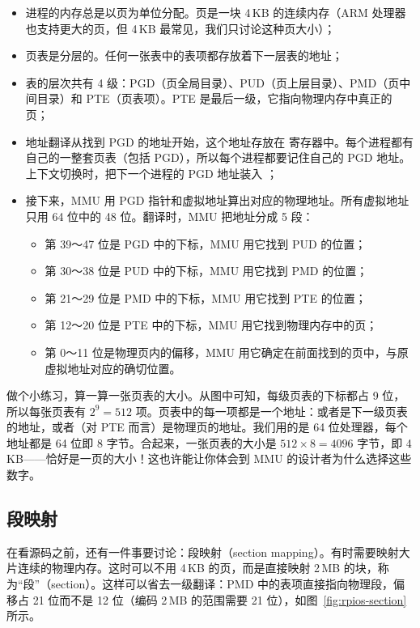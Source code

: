 \begin{itemize}
  \item 进程的内存总是以页为单位分配。页是一块 4\,KB 的连续内存（ARM 处理器也支持更大的页，但 4\,KB 最常见，我们只讨论这种页大小）；
  \item 页表是分层的。任何一张表中的表项都存放着下一层表的地址；
  \item 表的层次共有 4 级：PGD（页全局目录）、PUD（页上层目录）、PMD（页中间目录）和 PTE（页表项）。PTE 是最后一级，它指向物理内存中真正的页；
  \item 地址翻译从找到 PGD 的地址开始，这个地址存放在  寄存器中。每个进程都有自己的一整套页表（包括 PGD），所以每个进程都要记住自己的 PGD 地址。上下文切换时，把下一个进程的 PGD 地址装入 ；
  \item 接下来，MMU 用 PGD 指针和虚拟地址算出对应的物理地址。所有虚拟地址只用 64 位中的 48 位。翻译时，MMU 把地址分成 5 段：
  \begin{itemize}
    \item 第 39～47 位是 PGD 中的下标，MMU 用它找到 PUD 的位置；
    \item 第 30～38 位是 PUD 中的下标，MMU 用它找到 PMD 的位置；
    \item 第 21～29 位是 PMD 中的下标，MMU 用它找到 PTE 的位置；
    \item 第 12～20 位是 PTE 中的下标，MMU 用它找到物理内存中的页；
    \item 第 0～11 位是物理页内的偏移，MMU 用它确定在前面找到的页中，与原虚拟地址对应的确切位置。
  \end{itemize}
\end{itemize}

做个小练习，算一算一张页表的大小。从图中可知，每级页表的下标都占 9 位，所以每张页表有 $2^9 = 512$ 项。页表中的每一项都是一个地址：或者是下一级页表的地址，或者（对 PTE 而言）是物理页的地址。我们用的是 64 位处理器，每个地址都是 64 位即 8 字节。合起来，一张页表的大小是 $512 \times 8 = 4096$ 字节，即 4\,KB——恰好是一页的大小！这也许能让你体会到 MMU 的设计者为什么选择这些数字。

\subsection{段映射}

在看源码之前，还有一件事要讨论：段映射（section mapping）。有时需要映射大片连续的物理内存。这时可以不用 4\,KB 的页，而是直接映射 2\,MB 的块，称为“段”（section）。这样可以省去一级翻译：PMD 中的表项直接指向物理段，偏移占 21 位而不是 12 位（编码 2\,MB 的范围需要 21 位），如图~\ref{fig:rpios-section} 所示。

